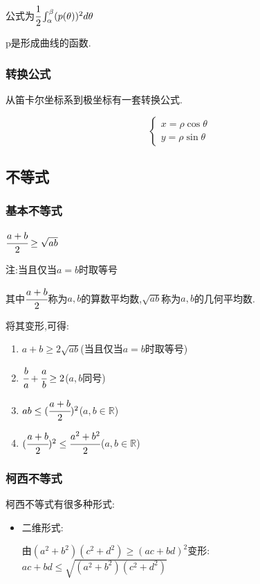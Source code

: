 \documentclass[UTF8,12pt]{ctexbook}
\newcommand{\definiteIntegral}[2]{\int^{#1}_{#2}}
\newcommand{\mathRealNumberCollection}{\mathbb{R}}
\begin{document}
{{{{  公式为$\cfrac{1}{2}\definiteIntegral{\beta}{\alpha}(p(\theta))^2d\theta$

  p是形成曲线的函数.
  }%

  \subsubsection{转换公式}{
    从笛卡尔坐标系到极坐标有一套转换公式.

    $$
      \begin{cases}
        x = \rho\cos\theta \\
        y = \rho\sin\theta
      \end{cases}
    $$
  }%

}%

\subsection{不等式}{

\subsubsection{基本不等式}{
  $\cfrac{a + b}{2} \geq \sqrt{ab}$

  注:当且仅当$a = b$时取等号

  其中$\cfrac{a+b}{2}$称为$a,b$的算数平均数,$\sqrt{ab}$称为$a,b$的几何平均数.

  将其变形,可得:
  \begin{enumerate}
    \item $a + b \geq 2\sqrt{ab}$(当且仅当$a = b$时取等号)
    \item $\cfrac{b}{a} + \cfrac{a}{b} \geq 2$($a,b$同号)
    \item $ab \leq (\cfrac{a + b}{2})^2$($a,b\in\mathRealNumberCollection$)
    \item $(\cfrac{a + b}{2})^2 \leq \cfrac{a^2 + b^2}{2}$($a,b\in\mathRealNumberCollection$)
  \end{enumerate}
}%


\subsubsection{柯西不等式}{
  柯西不等式有很多种形式:
  \begin{itemize}
    \item {
          二维形式:

          由$(a^2 + b^2)(c^2 + d^2)\geq(ac + bd)^2$变形:$ac + bd \leq \sqrt{(a^2 + b^2)(c^2 + d^2)}$

}
\end{itemize}}}}}
\end{document}
